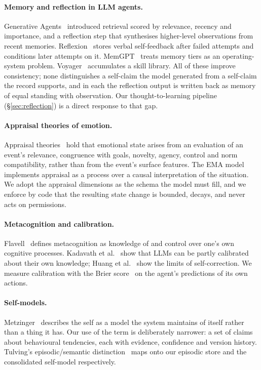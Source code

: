 \documentclass[11pt]{article}
\begin{document}
\paragraph{Memory and reflection in LLM agents.} Generative Agents~\cite{park2023generative} introduced retrieval scored by relevance, recency and importance, and a reflection step that synthesises higher-level observations from recent memories. Reflexion~\cite{shinn2023reflexion} stores verbal self-feedback after failed attempts and conditions later attempts on it. MemGPT~\cite{packer2023memgpt} treats memory tiers as an operating-system problem. Voyager~\cite{wang2023voyager} accumulates a skill library. All of these improve consistency; none distinguishes a self-claim the model generated from a self-claim the record supports, and in each the reflection output is written back as memory of equal standing with observation. Our thought-to-learning pipeline (\S\ref{sec:reflection}) is a direct response to that gap.

\paragraph{Appraisal theories of emotion.} Appraisal theories~\cite{scherer2001appraisal,ortony1988cognitive} hold that emotional state arises from an evaluation of an event's relevance, congruence with goals, novelty, agency, control and norm compatibility, rather than from the event's surface features. The EMA model~\cite{marsella2009ema} implements appraisal as a process over a causal interpretation of the situation. We adopt the appraisal dimensions as the schema the model must fill, and we enforce by code that the resulting state change is bounded, decays, and never acts on permissions.

\paragraph{Metacognition and calibration.} Flavell~\cite{flavell1979metacognition} defines metacognition as knowledge of and control over one's own cognitive processes. Kadavath et al.~\cite{kadavath2022know} show that LLMs can be partly calibrated about their own knowledge; Huang et al.~\cite{huang2024cannot} show the limits of self-correction. We measure calibration with the Brier score~\cite{brier1950verification} on the agent's predictions of its own actions.

\paragraph{Self-models.} Metzinger~\cite{metzinger2003being} describes the self as a model the system maintains of itself rather than a thing it has. Our use of the term is deliberately narrower: a set of claims about behavioural tendencies, each with evidence, confidence and version history. Tulving's episodic/semantic distinction~\cite{tulving1972episodic} maps onto our episodic store and the consolidated self-model respectively.
\end{document}
